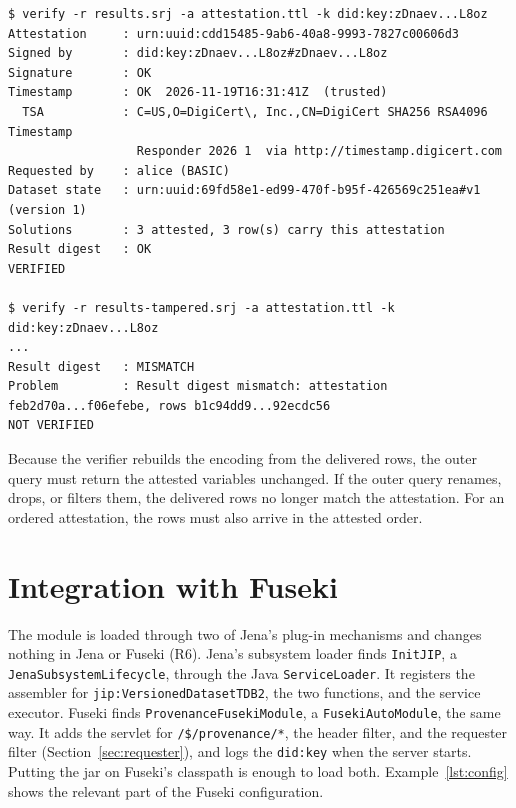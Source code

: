 \documentclass[11pt,a4paper]{article}
\newcommand{\code}[1]{\texttt{#1}}
\begin{document}
\begin{lstlisting}[basicstyle=\ttfamily\footnotesize, caption={Verifier output for the demo results and for a tampered copy (key IRIs shortened, TSA line wrapped).}, label={lst:verify}]
$ verify -r results.srj -a attestation.ttl -k did:key:zDnaev...L8oz
Attestation     : urn:uuid:cdd15485-9ab6-40a8-9993-7827c00606d3
Signed by       : did:key:zDnaev...L8oz#zDnaev...L8oz
Signature       : OK
Timestamp       : OK  2026-11-19T16:31:41Z  (trusted)
  TSA           : C=US,O=DigiCert\, Inc.,CN=DigiCert SHA256 RSA4096 Timestamp
                  Responder 2026 1  via http://timestamp.digicert.com
Requested by    : alice (BASIC)
Dataset state   : urn:uuid:69fd58e1-ed99-470f-b95f-426569c251ea#v1  (version 1)
Solutions       : 3 attested, 3 row(s) carry this attestation
Result digest   : OK
VERIFIED

$ verify -r results-tampered.srj -a attestation.ttl -k did:key:zDnaev...L8oz
...
Result digest   : MISMATCH
Problem         : Result digest mismatch: attestation feb2d70a...f06efebe, rows b1c94dd9...92ecdc56
NOT VERIFIED
\end{lstlisting}

Because the verifier rebuilds the encoding from the delivered rows, the outer query must
return the attested variables unchanged. If the outer query renames, drops, or filters them,
the delivered rows no longer match the attestation. For an ordered attestation, the rows must
also arrive in the attested order.

\section{Integration with Fuseki}
\label{sec:fuseki}

The module is loaded through two of Jena's plug-in mechanisms and changes nothing in Jena or
Fuseki (R6). Jena's subsystem loader finds \code{InitJIP}, a \code{JenaSubsystemLifecycle}, through the
Java \code{ServiceLoader}. It registers the assembler for \code{jip:VersionedDatasetTDB2}, the
two functions, and the service executor. Fuseki finds \code{ProvenanceFusekiModule}, a
\code{FusekiAutoModule}, the same way. It adds the servlet for \code{/\$/provenance/*}, the
header filter, and the requester filter (Section~\ref{sec:requester}), and logs the
\code{did:key} when the server starts. Putting the jar on Fuseki's
classpath is enough to load both. Example~\ref{lst:config} shows the relevant part of the
Fuseki configuration.
\end{document}
